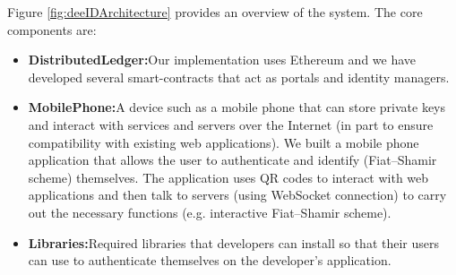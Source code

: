 Figure \ref{fig:deeIDArchitecture} provides an overview of the system. The core components are:
\begin{itemize}
    \item \textbf{Distributed\;Ledger:}\;Our implementation uses Ethereum and we have developed several smart-contracts that act as portals and identity managers.
    \item \textbf{Mobile\;Phone:}\;A device such as a mobile phone that can store private keys and interact with services and servers over the Internet (in part to ensure compatibility with existing web applications). We built a mobile phone application that allows the user to authenticate and identify (Fiat--Shamir scheme) themselves. The application uses QR codes to interact with web applications and then talk to servers (using WebSocket connection) to carry out the necessary functions (e.g. interactive Fiat--Shamir scheme).
    \item \textbf{Libraries:}\;Required libraries that developers can install so that their users can use \deeid to authenticate themselves on the developer's application.
\end{itemize}

